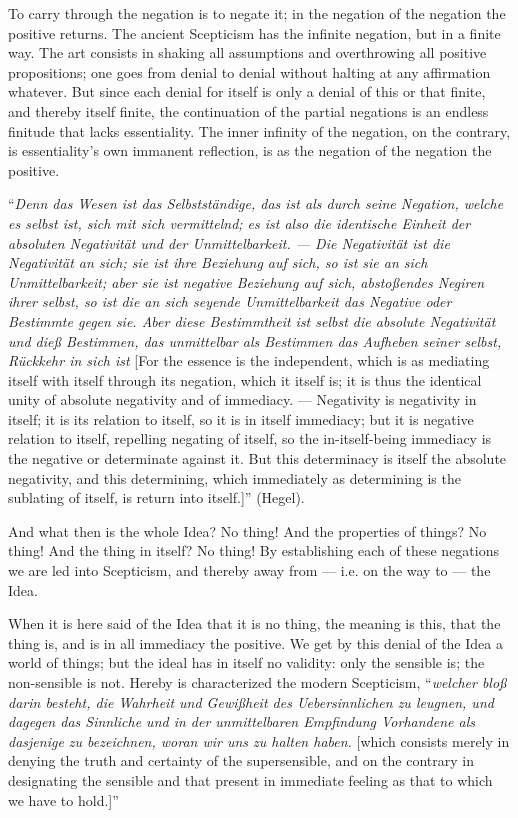 \documentclass[12pt]{book}
\begin{document}
To carry through the negation is to negate it; in the negation of the negation the positive returns.
The ancient Scepticism has the infinite negation, but in a finite way. The art consists in shaking all
assumptions and overthrowing all positive propositions; one goes from denial to denial without halting
at any affirmation whatever. But since each denial for itself is only a denial of this or that finite,
and thereby itself finite, the continuation of the partial negations is an endless finitude that lacks
essentiality. The inner infinity of the negation, on the contrary, is essentiality's own immanent
reflection, is as the negation of the negation the positive.

``\textit{Denn das Wesen ist das Selbstständige, das ist als durch seine Negation, welche es selbst
ist, sich mit sich vermittelnd; es ist also die identische Einheit der absoluten Negativität und der
Unmittelbarkeit. — Die Negativität ist
die Negativität an sich; sie ist ihre Beziehung auf sich, so ist sie an sich Unmittelbarkeit; aber sie
ist negative Beziehung auf sich, abstoßendes Negiren ihrer selbst, so ist die an sich seyende
Unmittelbarkeit das Negative oder Bestimmte gegen sie. Aber diese Bestimmtheit ist selbst die absolute
Negativität und dieß Bestimmen, das unmittelbar als Bestimmen das Aufheben seiner selbst, Rückkehr in
sich ist} [For the essence is the independent, which is as mediating itself with itself through its
negation, which it itself is; it is thus the identical unity of absolute negativity and of immediacy. —
Negativity is negativity in itself; it is its relation to itself, so it is in itself immediacy; but it
is negative relation to itself, repelling negating of itself, so the in-itself-being immediacy is the
negative or determinate against it. But this determinacy is itself the absolute negativity, and this
determining, which immediately as determining is the sublating of itself, is return into itself.]''
(Hegel).

And what then is the whole Idea? No thing! And the properties of things? No thing! And the thing in
itself? No thing! By establishing each of these negations we are led into Scepticism, and thereby away
from — i.e. on the way to — the Idea.

When it is here said of the Idea that it is no thing, the meaning is this, that the thing is, and is in
all immediacy the positive. We get by this denial of the Idea a world of things; but the ideal has in
itself no validity: only the sensible is; the non-sensible is not. Hereby is characterized the modern
Scepticism, ``\textit{welcher bloß darin besteht, die Wahrheit und Gewißheit des Uebersinnlichen zu
leugnen, und dagegen das Sinnliche und in der unmittelbaren Empfindung Vorhandene als dasjenige zu
bezeichnen, woran wir uns zu halten haben.} [which consists merely in denying the truth and certainty
of the supersensible, and on the contrary in designating the sensible and that present in immediate
feeling as that to which we have to hold.]''
\end{document}
